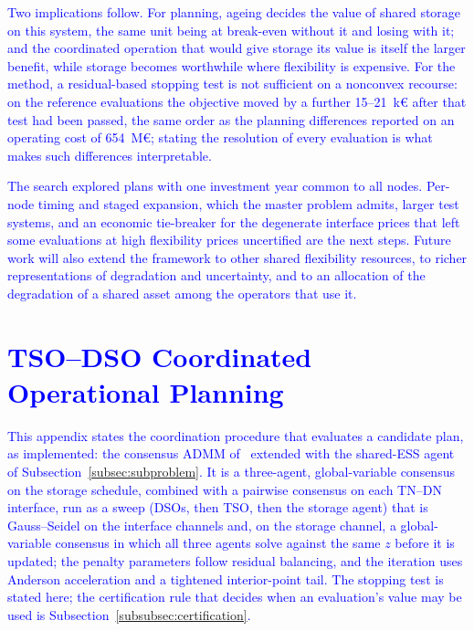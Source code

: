 \documentclass[preprint,12pt]{elsarticle}
\begin{document}
\textcolor{blue}{
    Two implications follow. For planning, ageing decides the value of shared storage on this system, the same unit being at break-even without it and losing with it; and the coordinated operation that would give storage its value is itself the larger benefit, while storage becomes worthwhile where flexibility is expensive. 
    For the method, a residual-based stopping test is not sufficient on a nonconvex recourse: on the reference evaluations the objective moved by a further 15--21~k\euro{} after that test had been passed, the same order as the planning differences reported on an operating cost of 654~M\euro{}; stating the resolution of every evaluation is what makes such differences interpretable.
}

\textcolor{blue}{
    The search explored plans with one investment year common to all nodes. Per-node timing and staged expansion, which the master problem admits, larger test systems, and an economic tie-breaker for the degenerate interface prices that left some evaluations at high flexibility prices uncertified are the next steps.
    Future work will also extend the framework to other shared flexibility resources, to richer representations of degradation and uncertainty, and to an allocation of the degradation of a shared asset among the operators that use it.
}

\appendix


\section{\textcolor{blue}{TSO--DSO Coordinated Operational Planning}}
\label{app:admm_updated}

\textcolor{blue}{
    This appendix states the coordination procedure that evaluates a candidate plan, as implemented: the consensus ADMM of~\cite{simoes_2023} extended with the shared-ESS agent of Subsection~\ref{subsec:subproblem}. It is a three-agent, global-variable consensus on the storage schedule, combined with a pairwise consensus on each TN--DN interface, run as a sweep (DSOs, then TSO, then the storage agent) that is Gauss--Seidel on the interface channels and, on the storage channel, a global-variable consensus in which all three agents solve against the same $z$ before it is updated; the penalty parameters follow residual balancing, and the iteration uses Anderson acceleration and a tightened interior-point tail.
    The stopping test is stated here; the certification rule that decides when an evaluation's value may be used is Subsection~\ref{subsubsec:certification}.
}
\end{document}
